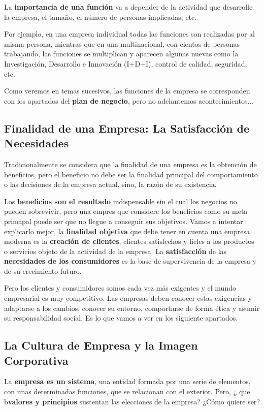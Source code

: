 La \textbf{importancia de una función} va a depender de la actividad que desarrolle la empresa, el tamaño, el número de personas implicadas, etc.

Por ejemplo, en una empresa individual todas las funciones son realizadas por al misma persona, mientras que en una multinacional, con cientos de personas trabajando, las funciones se multiplican y aparecen algunas nuevas como la Investigación, Desarrollo e Innovación (I+D+I), control de calidad, seguridad, etc.

Como veremos en temas sucesivos, las funciones de la empresa se corresponden con los apartados del \textbf{plan de negocio}, pero no adelantemos acontecimientos...

\subsection{Finalidad de una Empresa: La Satisfacción de Necesidades}
Tradicionalmente se considera que la finalidad de una empresa es la obtención de beneficios, pero el beneficio no debe ser la finalidad principal del comportamiento o las decisiones de la empresa actual, sino, la razón de su existencia.

Los \textbf{beneficios son el resultado} indispensable sin el cual los negocios no pueden sobrevivir, pero una empres que considere los beneficios como su meta principal puede ser que no llegue a conseguir sus objetivos. Vamos a intentar explicarlo mejor, la \textbf{finalidad objetiva} que debe tener en cuenta una empresa moderna es la \textbf{creación de clientes}, clientes satisfechos y fieles a los productos o servicios objeto de la actividad de la empresa. La \textbf{satisfacción} de las \textbf{necesidades de los consumidores} es la base de supervivencia de la empresa y de su crecimiento futuro.

Pero los clientes y consumidores somos cada vez más exigentes y el mundo empresarial es muy competitivo. Las empresas deben conocer estas exigencias y adaptarse a los cambios, conocer su entorno, comportarse de forma ética y asumir su responsabilidad social. Es lo que vamos a ver en los siguiente apartados.

\subsection{La Cultura de Empresa y la Imagen Corporativa}
La \textbf{empresa es un sistema}, una entidad formada por una serie de elementos, con unas determinadas funciones, que se relacionan con el exterior. Pero, ¿ que b\textbf{valores y principios} sustentan las elecciones de la empresa? ¿Cómo quiere ser?

